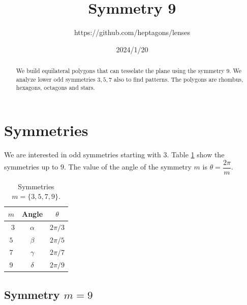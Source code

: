 \documentclass[11pt]{article}
\title{Symmetry 9}
\author{https://github.com/heptagons/lenses}
\date{2024/1/20}
\begin{document}
\maketitle
\begin{abstract}
We build equilateral polygons that can tesselate the plane using the symmetry $9$. We analyze lower odd symmetries $3,5,7$ also to find patterns. The polygons are rhombus, hexagons, octagons and stars.
\end{abstract}

\section{Symmetries}

We are interested in odd symmetries starting with $3$. Table \ref{tbl:symm} show the symmetries up to $9$. The value of the angle of the symmetry $m$ is $\theta = \dfrac{2\pi}m$. 

\begin{table}[H]
\begin{center}
\begin{tabular}{|c|c c|}
\hline
$m$ & Angle & $\theta$ \\ \hline\
$3$ & $\alpha$ & $2\pi/3$ \\ \hline
$5$ & $\beta$  & $2\pi/5$ \\ \hline
$7$ & $\gamma$ & $2\pi/7$ \\ \hline
$9$ & $\delta$ & $2\pi/9$ \\ \hline
\end{tabular}
\caption{Symmetries $m=\{3,5,7,9\}$.} 
\label{tbl:symm}
\end{center}
\end{table}

\subsection{Symmetry $m=9$}
\end{document}
